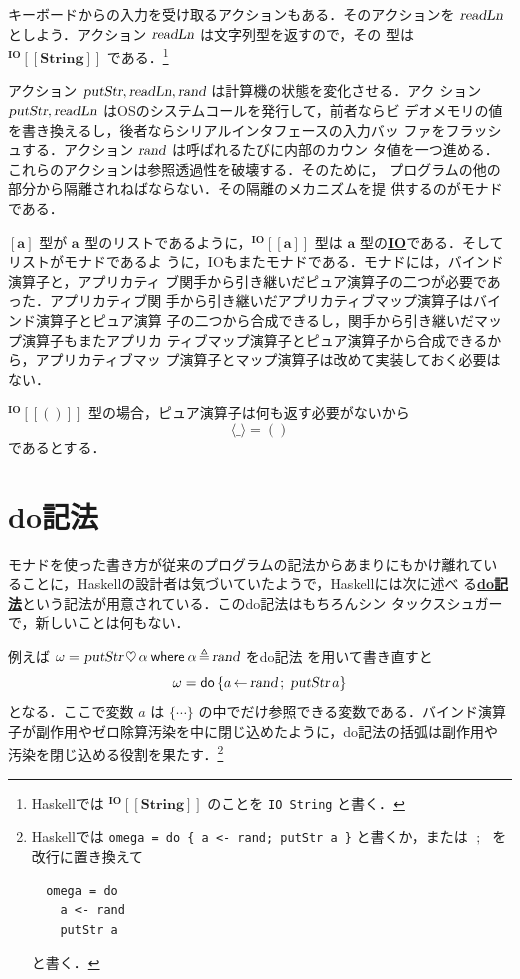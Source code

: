 \documentclass[a5paper,twoside,fleqn,draft]{jsbook}
\def\[{[\![}
\def\]{]\!]}
\newcommand{\programminglanguage}[1]{\textsf{#1}}
\newcommand{\haskell}{\programminglanguage{Haskell}}
\newcommand{\keyword}[1]{{\underline{\textbf{#1}}}}
\newcommand{\code}[1]{\texttt{#1}}
\newcommand{\mKeyword}[1]{\mathsf{#1}}
\newcommand{\mDoKeyword}{\mKeyword{do}}
\newcommand{\mWhereKeyword}{\mKeyword{where}}
\DeclareMathOperator{\mDoKW}{\mDoKeyword}
\newcommand{\mAction}[1]{\textsl{#1}}
\DeclareMathOperator{\mReadLn}{\mAction{readLn}}
\DeclareMathOperator{\mPutStr}{\mAction{putStr}}
\DeclareMathOperator{\mRand}{\mAction{rand}}
\DeclareMathOperator{\mBind}{\heartsuit}
\DeclareMathOperator{\mDoEq}{\leftarrow}
\DeclareMathOperator{\mDoNext}{;\;}
\DeclareMathOperator{\mLetEq}{\triangleq}
\newcommand{\mType}[1]{\mathbf{#1}} %
\newcommand{\mA}{\mType{a}}
\newcommand{\mStringType}{\mType{String}}
\newcommand{\mUnitType}{\mType{()}}
\newcommand{\mTypeAssemble}[2]{{}^{\mType{#1}}\[\mType{#2}\]}
\newcommand{\mIOType}[1]{\mTypeAssemble{IO}{#1}}
\newcommand{\mIOStringType}{\mIOType{\mStringType}}
\newcommand{\mIOUnitType}{\mIOType{\mUnitType}}
\newcommand{\mPureWith}[1]{\langle#1\rangle}
\newcommand{\mTupleWith}[1]{\left(#1\right)} %
\newcommand{\mDo}[1]{\mDoKW\left\{#1\right\}}
\newcommand{\mWhereIsEXP}[2]{\mathbin{\mWhereKeyword}#1\mLetEq#2} %
\begin{document}
キーボードからの入力を受け取るアクションもある．そのアクションを
$\mReadLn$ としよう．アクション $\mReadLn$ は文字列型を返すので，その
型は $\mIOStringType$ である．\footnote{\haskell では $\mIOStringType$
のことを \code{IO String} と書く．}

アクション $\mPutStr,\mReadLn,\mRand$ は計算機の状態を変化させる．アク
ション $\mPutStr,\mReadLn$ はOSのシステムコールを発行して，前者ならビ
デオメモリの値を書き換えるし，後者ならシリアルインタフェースの入力バッ
ファをフラッシュする．アクション $\mRand$ は呼ばれるたびに内部のカウン
タ値を一つ進める．これらのアクションは参照透過性を破壊する．そのために，
プログラムの他の部分から隔離されねばならない．その隔離のメカニズムを提
供するのがモナドである．

$[\mA]$ 型が $\mA $ 型のリストであるように，$\mIOType{a}$
型は $\mA $ 型の\keyword{IO}である．そしてリストがモナドであるよ
うに，IOもまたモナドである．モナドには，バインド演算子と，アプリカティ
ブ関手から引き継いだピュア演算子の二つが必要であった．アプリカティブ関
手から引き継いだアプリカティブマップ演算子はバインド演算子とピュア演算
子の二つから合成できるし，関手から引き継いだマップ演算子もまたアプリカ
ティブマップ演算子とピュア演算子から合成できるから，アプリカティブマッ
プ演算子とマップ演算子は改めて実装しておく必要はない．

$\mIOUnitType$ 型の場合，ピュア演算子は何も返す必要がないから
\begin{equation}
\mPureWith{\_}=()
\end{equation}
であるとする．





\section{do記法}

モナドを使った書き方が従来のプログラムの記法からあまりにもかけ離れてい
ることに，\haskell の設計者は気づいていたようで，\haskell には次に述べ
る\keyword{do記法}という記法が用意されている．このdo記法はもちろんシン
タックスシュガーで，新しいことは何もない．

例えば $\omega=\mPutStr\mBind\alpha\mWhereIsEXP{\alpha}{\mRand}$ をdo記法
を用いて書き直すと
\begin{equation}
\label{eq:do-print-random}
\omega=\mDo{a\mDoEq\mRand\mDoNext\mPutStr a}
\end{equation}
となる．ここで変数 $a$ は $\{\dotsb\}$ の中でだけ参照できる変数である．バインド演算子が副作用やゼロ除算汚染を中に閉じ込めたように，do記法の括弧は副作用や汚染を閉じ込める役割を果たす．\footnote{\haskell では \code{omega = do \{ a <- rand; putStr
a \}} と書くか，または $\mDoNext$ を改行に置き換えて
\begin{verbatim}
  omega = do
    a <- rand
    putStr a
\end{verbatim}
と書く．}
\end{document}

